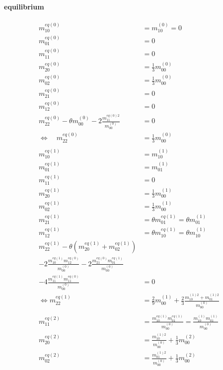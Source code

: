 \documentclass{article}
\begin{document}
  \paragraph{equilibrium}
  \begin{align}
      m_{10}^{eq(0)} & = m_{10}^{(0)} = 0 \tag{Q1}
      \\
      m_{01}^{eq(0)} & = 0 \tag{Q2}
      \\
      m_{11}^{eq(0)} & = 0 \tag{Q3}
      \\
      m_{20}^{eq(0)} & = \frac{1}{3} m_{00}^{(0)} \tag{Q4}
      \\
      m_{02}^{eq(0)} & = \frac{1}{3} m_{00}^{(0)} \tag{Q5}
      \\
      m_{21}^{eq(0)} & = 0 \tag{Q6}
      \\
      m_{12}^{eq(0)} & = 0 \tag{Q7}
      \\
      m_{22}^{eq(0)} - \theta m_{00}^{(0)} - 2\frac{ m_{11}^{eq(0)2}}{m_{00}^{(0)}} & = 0 \tag{Q8}
      \\
      \Leftrightarrow\quad m_{22}^{eq(0)} & = \frac{1}{3} m_{00}^{(0)} \tag{Q9}
      \\\nonumber&\\
      m_{10}^{eq(1)} & = m_{10}^{(1)}  \tag{Q10}
      \\
      m_{01}^{eq(1)} & = m_{01}^{(1)}  \tag{Q11}
      \\
      m_{11}^{eq(1)} & = 0  \tag{Q12}
      \\
      m_{20}^{eq(1)} & = \frac{1}{3} m_{00}^{(1)}  \tag{Q13}
      \\
      m_{02}^{eq(1)} & = \frac{1}{3} m_{00}^{(1)}  \tag{Q14}
      \\
      m_{21}^{eq(1)} & = \theta m_{01}^{eq(1)} = \theta m_{01}^{(1)} \tag{Q15}
      \\
      m_{12}^{eq(1)} & = \theta m_{10}^{eq(1)} = \theta m_{10}^{(1)}  \tag{Q16}
      \\
      m_{22}^{eq(1)}
      - \theta (m_{20}^{eq(1)} + m_{02}^{eq(1)})
      &\nonumber \\
      - 2\frac{ m_{10}^{eq(1)} m_{12}^{eq(0)} }{m_{00}^{(0)}}
      - 2\frac{ m_{21}^{eq(0)} m_{01}^{eq(1)} }{m_{00}^{(0)}}
      &\nonumber \\
      - 4\frac{ m_{11}^{eq(1)} m_{11}^{eq(0)} }{m_{00}^{(0)}} & = 0 \tag{Q17}
      \\
      \Leftrightarrow m_{22}^{eq(1)} & = \frac{2}{9} m_{00}^{(1)} \tag{Q18}
      + \frac{2}{3}\frac{  m_{10}^{(1)2} +m_{01}^{(1)2} }{m_{00}^{(0)}}
      \\\nonumber&\\
      m_{11}^{eq(2)} & = \frac{ m_{10}^{eq(1)}m_{01}^{eq(1)}}{m_{00}^{(0)}}= \frac{ m_{10}^{(1)}m_{01}^{(1)}}{m_{00}^{(0)}}  \tag{Q19}
      \\
      m_{20}^{eq(2)} &= \frac{ m_{10}^{(1)2}}{m_{00}^{(0)}} + \frac{1}{3} m_{00}^{(2)}  \tag{Q20}
      \\
      m_{02}^{eq(2)} &= \frac{ m_{01}^{(1)2}}{m_{00}^{(0)}} + \frac{1}{3} m_{00}^{(2)} \tag{Q21}
  \end{align}
\end{document}
